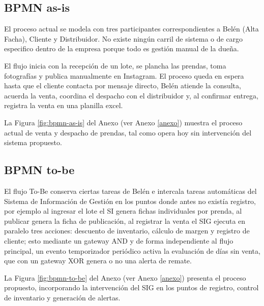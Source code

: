 \documentclass[11pt,letterpaper]{article}
\begin{document}
\subsection*{BPMN as-is}
El proceso actual se modela con tres participantes correspondientes a Belén (Alta Facha), Cliente y Distribuidor. No existe ningún carril de sistema o de cargo especifico dentro de la empresa porque todo es gestión manual de la dueña.

El flujo inicia con la recepción de un lote, se plancha las prendas, toma fotografías y publica manualmente en Instagram. El proceso queda en espera hasta que el cliente contacta por mensaje directo, Belén atiende la consulta, acuerda la venta, coordina el despacho con el distribuidor y, al confirmar entrega, registra la venta en una planilla excel.

La Figura \ref{fig:bpmn-as-is} del Anexo (ver Anexo \ref{anexo}) muestra el proceso actual de venta y despacho de prendas, tal como opera hoy sin intervención del sistema propuesto.


\subsection*{BPMN to-be}

El flujo To-Be conserva ciertas tareas de Belén e intercala tareas automáticas del Sistema de Información de Gestión en los puntos donde antes no existía registro, por ejemplo al ingresar el lote el SI genera fichas individuales por prenda, al publicar genera la ficha de publicación, al registrar la venta el SIG ejecuta en paralelo tres acciones: descuento de inventario, cálculo de margen y registro de cliente; esto mediante un gateway AND y de forma independiente al flujo principal, un evento temporizador periódico activa la evaluación de días sin venta, que con un gateway XOR genera o no una alerta de remate.

La Figura \ref{fig:bpmn-to-be} del Anexo (ver Anexo \ref{anexo}) presenta el proceso propuesto, incorporando la intervención del SIG en los puntos de registro, control de inventario y generación de alertas.
\end{document}
